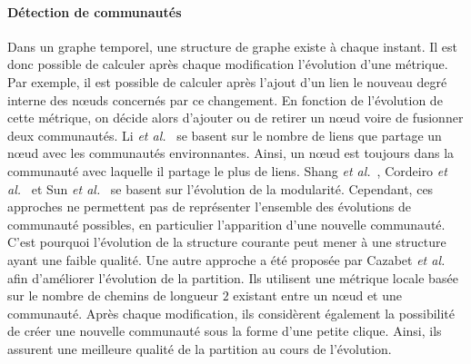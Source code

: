 \paragraph{Détection de communautés}
Dans un graphe temporel, une structure de graphe existe à chaque instant.
Il est donc possible de calculer après chaque modification l'évolution d'une métrique.
Par exemple, il est possible de calculer après l'ajout d'un lien le nouveau degré interne des n\oe{}uds concernés par ce changement.
En fonction de l'évolution de cette métrique, on décide alors d'ajouter ou de retirer un n\oe{}ud voire de fusionner deux communautés.
Li \emph{et al.}~\cite{Li2012a} se basent sur le nombre de liens que partage un n\oe{}ud avec les communautés environnantes.
Ainsi, un n\oe{}ud est toujours dans la communauté avec laquelle il partage le plus de liens.
Shang \emph{et al.}~\cite{Shang2014a}, Cordeiro \emph{et al.}~\cite{Cordeiro2016} et Sun \emph{et al.}~\cite{Sun2014} se basent sur l'évolution de la modularité.
Cependant, ces approches ne permettent pas de représenter l'ensemble des évolutions de communauté possibles, en particulier l'apparition d'une nouvelle communauté.
C'est pourquoi l'évolution de la structure courante peut mener à une structure ayant une faible qualité.
Une autre approche a été proposée par Cazabet \emph{et al.}~\cite{Cazabet2010} afin d'améliorer l'évolution de la partition.
Ils utilisent une métrique locale basée sur le nombre de chemins de longueur $2$ existant entre un n\oe{}ud et une communauté.
Après chaque modification, ils considèrent également la possibilité de créer une nouvelle communauté sous la forme d'une petite clique.
Ainsi, ils assurent une meilleure qualité de la partition au cours de l'évolution.



